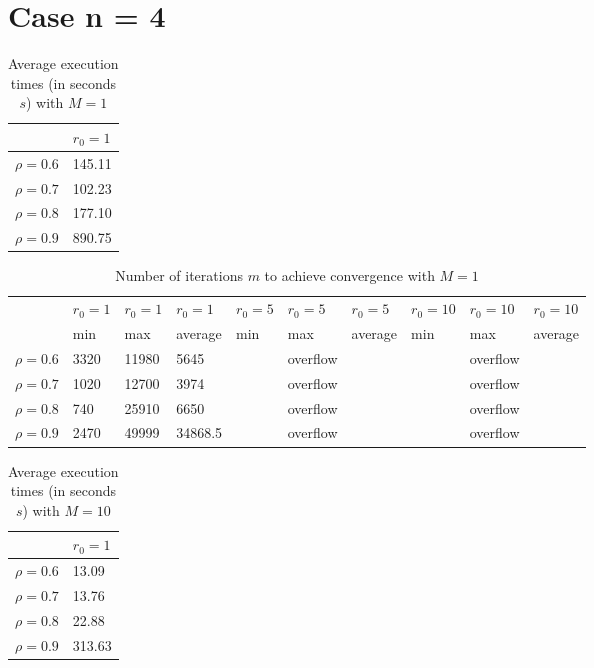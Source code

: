 \documentclass[a4paper,11pt,openright]{report}
\begin{document}
\section*{Case n = 4} 
\begin{table}[H]
\centering
\addtolength{\leftskip}{-1.5cm}
\addtolength{\rightskip}{-1.5cm}
\begin{tabular}{|c|l|}
\hline
$ $ & $r_0 = 1$  \\
\hline
$\rho = 0.6$ & 145.11 \\

$\rho = 0.7$ & 102.23 \\

$\rho = 0.8$ & 177.10 \\

$\rho = 0.9$ & 890.75 \\
\hline
\end{tabular}
\caption{Average execution
 times (in seconds $s$) with $M = 1$}
\end{table}
\begin{table}[H]
\centering
\addtolength{\leftskip}{-1.5cm}
\addtolength{\rightskip}{-1.5cm}
\begin{tabular}{|c|lllllllll|}
\hline
$ $ & $r_0 = 1$ & $r_0 = 1$ & $r_0 = 1$ & $r_0 = 5$ & $r_0 = 5$ & $r_0 = 5$ & $r_0 = 10$ & $r_0 = 10$ & $r_0 = 10$  \\
$ $ & min & max & average & min & max & average & min & max & average \\ 
\hline
$\rho = 0.6$ & 3320 & 11980 & 5645 &  & overflow & &  & overflow &  \\

$\rho = 0.7$ & 1020 & 12700 & 3974 &  & overflow & &  & overflow &  \\

$\rho = 0.8$ & 740 & 25910 & 6650 &  & overflow & &  & overflow &  \\

$\rho = 0.9$ & 2470 & 49999 & 34868.5 &  & overflow & &  & overflow &  \\
\hline
\end{tabular}
\caption{Number of iterations $m$ to achieve convergence with $M = 1$}
\end{table}
\begin{table}[H]
\centering
\addtolength{\leftskip}{-1.5cm}
\addtolength{\rightskip}{-1.5cm}
\begin{tabular}{|c|l|}
\hline
$ $ & $r_0 = 1$  \\
\hline
$\rho = 0.6$ &  13.09 \\

$\rho = 0.7$ &  13.76 \\

$\rho = 0.8$ &  22.88 \\

$\rho = 0.9$ &  313.63 \\
\hline
\end{tabular}
\caption{Average execution
 times (in seconds $s$) with $M = 10$}
\end{table}
\end{document}
